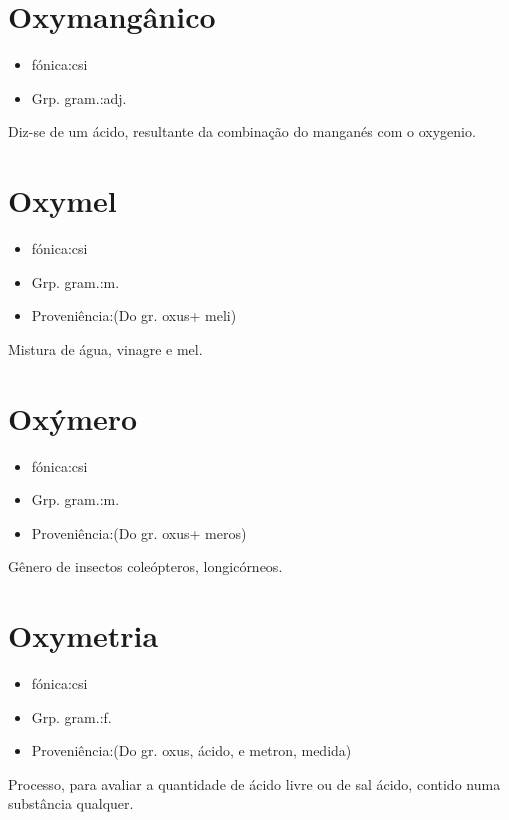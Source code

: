 \section{Oxymangânico}
\begin{itemize}
\item {fónica:csi}
\end{itemize}
\begin{itemize}
\item {Grp. gram.:adj.}
\end{itemize}
Diz-se de um ácido, resultante da combinação do manganés com o oxygenio.
\section{Oxymel}
\begin{itemize}
\item {fónica:csi}
\end{itemize}
\begin{itemize}
\item {Grp. gram.:m.}
\end{itemize}
\begin{itemize}
\item {Proveniência:(Do gr. \textunderscore oxus\textunderscore  + \textunderscore meli\textunderscore )}
\end{itemize}
Mistura de água, vinagre e mel.
\section{Oxýmero}
\begin{itemize}
\item {fónica:csi}
\end{itemize}
\begin{itemize}
\item {Grp. gram.:m.}
\end{itemize}
\begin{itemize}
\item {Proveniência:(Do gr. \textunderscore oxus\textunderscore  + \textunderscore meros\textunderscore )}
\end{itemize}
Gênero de insectos coleópteros, longicórneos.
\section{Oxymetria}
\begin{itemize}
\item {fónica:csi}
\end{itemize}
\begin{itemize}
\item {Grp. gram.:f.}
\end{itemize}
\begin{itemize}
\item {Proveniência:(Do gr. \textunderscore oxus\textunderscore , ácido, e \textunderscore metron\textunderscore , medida)}
\end{itemize}
Processo, para avaliar a quantidade de ácido livre ou de sal ácido, contido numa substância qualquer.
